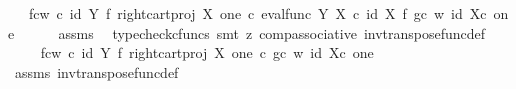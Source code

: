 \begin{isabellebody}
\ {\isachardoublequoteopen}{\isachardot}{\kern0pt}{\isachardot}{\kern0pt}{\isachardot}{\kern0pt}\ {\isacharequal}{\kern0pt}\ {\isacharparenleft}{\kern0pt}{\isacharparenleft}{\kern0pt}f{\isasymcirc}\isactrlsub cw{\isacharparenright}{\kern0pt}\isactrlsup {\isasymflat}\ {\isasymcirc}\isactrlsub c\ {\isacharparenleft}{\kern0pt}id\ {\isacharparenleft}{\kern0pt}Y{\isacharparenright}{\kern0pt}\ {\isasymtimes}\isactrlsub f\ right{\isacharunderscore}{\kern0pt}cart{\isacharunderscore}{\kern0pt}proj\ X\ one{\isacharparenright}{\kern0pt}\ {\isasymcirc}\isactrlsub c\ {\isasymlangle}eval{\isacharunderscore}{\kern0pt}func\ Y\ X\ {\isasymcirc}\isactrlsub c\ {\isacharparenleft}{\kern0pt}id\ X\ {\isasymtimes}\isactrlsub f\ {\isacharparenleft}{\kern0pt}g{\isasymcirc}\isactrlsub c\ w{\isacharparenright}{\kern0pt}{\isacharparenright}{\kern0pt}{\isacharcomma}{\kern0pt}\ id\ {\isacharparenleft}{\kern0pt}X{\isasymtimes}\isactrlsub c\ one{\isacharparenright}{\kern0pt}{\isasymrangle}{\isacharparenright}{\kern0pt}\isactrlsup {\isasymsharp}{\isachardoublequoteclose}\isanewline
\ \ \ \ \isamarkupfalse%
\ assms\ \isamarkupfalse%
\ {\isacharparenleft}{\kern0pt}typecheck{\isacharunderscore}{\kern0pt}cfuncs{\isacharcomma}{\kern0pt}\ smt\ {\isacharparenleft}{\kern0pt}z{}{\isacharparenright}{\kern0pt}\ comp{\isacharunderscore}{\kern0pt}associative{}\ inv{\isacharunderscore}{\kern0pt}transpose{\isacharunderscore}{\kern0pt}func{\isacharunderscore}{\kern0pt}def{}{\isacharparenright}{\kern0pt}\isanewline
\ \ \isamarkupfalse%
\ \isamarkupfalse%
\ {\isachardoublequoteopen}{\isachardot}{\kern0pt}{\isachardot}{\kern0pt}{\isachardot}{\kern0pt}\ {\isacharequal}{\kern0pt}\ {\isacharparenleft}{\kern0pt}{\isacharparenleft}{\kern0pt}f{\isasymcirc}\isactrlsub cw{\isacharparenright}{\kern0pt}\isactrlsup {\isasymflat}\ {\isasymcirc}\isactrlsub c\ {\isacharparenleft}{\kern0pt}id\ {\isacharparenleft}{\kern0pt}Y{\isacharparenright}{\kern0pt}\ {\isasymtimes}\isactrlsub f\ right{\isacharunderscore}{\kern0pt}cart{\isacharunderscore}{\kern0pt}proj\ X\ one{\isacharparenright}{\kern0pt}\ {\isasymcirc}\isactrlsub c\ {\isasymlangle}{\isacharparenleft}{\kern0pt}g{\isasymcirc}\isactrlsub c\ w{\isacharparenright}{\kern0pt}\isactrlsup {\isasymflat}{\isacharcomma}{\kern0pt}\ id\ {\isacharparenleft}{\kern0pt}X{\isasymtimes}\isactrlsub c\ one{\isacharparenright}{\kern0pt}{\isasymrangle}{\isacharparenright}{\kern0pt}\isactrlsup {\isasymsharp}{\isachardoublequoteclose}\isanewline
\ \ \ \ \isamarkupfalse%
\ assms\ inv{\isacharunderscore}{\kern0pt}transpose{\isacharunderscore}{\kern0pt}func{\isacharunderscore}{\kern0pt}def{}\ \isamarkupfalse%

\end{isabellebody}
